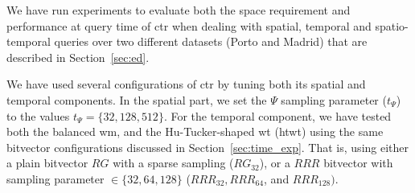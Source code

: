 	We have run experiments to evaluate both the space requirement and performance at query time of \gls{ctr}
	when dealing with spatial, temporal and spatio-temporal queries over two different datasets 
	(Porto and Madrid) that are described in Section~\ref{sec:ed}. 

	We have used several configurations of \gls{ctr} by tuning both its
	spatial and temporal components. In the spatial part, %
	we set the  $\Psi$ sampling parameter ($t_{\Psi}$) to the values $t_{\Psi} = \{32, 128, 512\}$. 
	For the temporal component, %
	we have tested both the 
	balanced \gls{wm}, and the Hu-Tucker-shaped \gls{wt} (\gls{htwt}) using the same bitvector configurations
	discussed in Section~\ref{sec:time_exp}. That is, using either a plain bitvector $RG$ with a 
	sparse sampling ($RG_{32}$), or a $RRR$ bitvector with sampling parameter $\in \{32,64,128\}$ 
	($RRR_{32}, RRR_{64}$, and $ RRR_{128})$.


